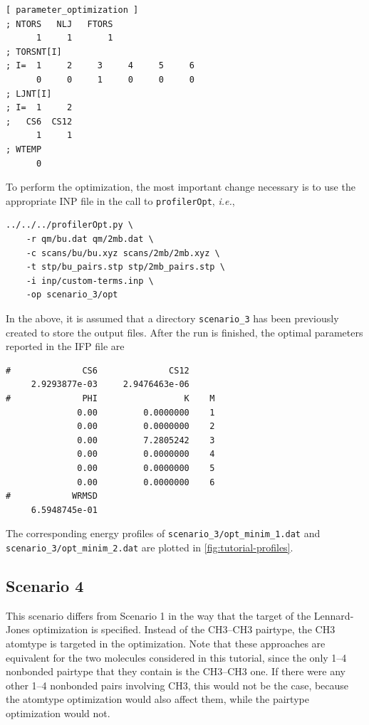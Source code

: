 \documentclass[10pt,a4paper,openany]{memoir}
\numberwithin{equation}{section}
\newcommand{\under}{\_}
\newcommand{\profileropt}[0]{\texttt{profilerOpt}}
\begin{document}
\begin{lstlisting}[language=gromacs]
[ parameter_optimization ]
; NTORS   NLJ   FTORS
      1     1       1    
; TORSNT[I]
; I=  1     2     3     4     5     6
      0     0     1     0     0     0
; LJNT[I]
; I=  1     2
;   CS6  CS12
      1     1
; WTEMP
      0
\end{lstlisting}\vspace{1ex}\par

\noindent 
%
To perform the optimization, the most important change necessary is to
use the appropriate INP file in the call to \profileropt,
\textit{i.e.},

\begin{lstlisting}
../../../profilerOpt.py \
    -r qm/bu.dat qm/2mb.dat \
    -c scans/bu/bu.xyz scans/2mb/2mb.xyz \
    -t stp/bu_pairs.stp stp/2mb_pairs.stp \
    -i inp/custom-terms.inp \
    -op scenario_3/opt 
\end{lstlisting}\vspace{1ex}\par

\noindent In the above, it is assumed that a directory
\texttt{scenario\under{}3} has been previously created to store the
output files.
%
After the run is finished, the optimal parameters reported in the IFP
file are

\begin{lstlisting}
#              CS6              CS12
     2.9293877e-03     2.9476463e-06
#              PHI                 K    M
              0.00         0.0000000    1
              0.00         0.0000000    2
              0.00         7.2805242    3
              0.00         0.0000000    4
              0.00         0.0000000    5
              0.00         0.0000000    6
#            WRMSD
     6.5948745e-01
\end{lstlisting}\vspace{1ex}\par

\noindent The corresponding energy profiles of
\texttt{scenario\under{}3/opt\under{}minim\under{}1.dat} and
\texttt{scenario\under{}3/opt\under{}minim\under{}2.dat} are plotted
in \autoref{fig:tutorial-profiles}.

\subsection{Scenario 4}
\label{sec:tutorial-scenario-4}

This scenario differs from Scenario 1 in the way that the target of
the Lennard-Jones optimization is specified.
%
Instead of the CH3--CH3 pairtype, the CH3 atomtype is targeted in the
optimization.
%
Note that these approaches are equivalent for the two molecules
considered in this tutorial, since the only 1--4 nonbonded pairtype
that they contain is the CH3--CH3 one.
%
If there were any other 1--4 nonbonded pairs involving CH3, this would
not be the case, because the atomtype optimization would also affect
them, while the pairtype optimization would not.
%
\end{document}
